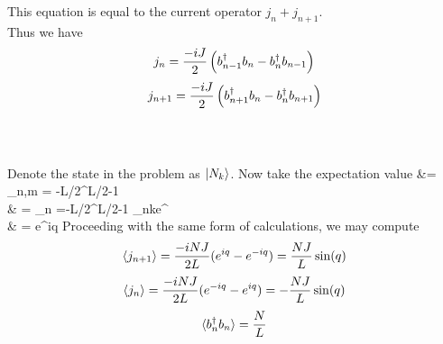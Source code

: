 \documentclass[10pt,letterpaper]{article}
\begin{document}
This equation is equal to the current operator $j_n+j_{n+1}$.\\
Thus we have
\[
	j_n =  \frac{-i J}{2}\left( b_{n-1}^\dag b_n - b_n^\dag b_{n-1}\right)
\]
\[
	j_{n+1} = \frac{-iJ}{2}\left( b_{n+1}^\dag b_n - b_n^\dag b_{n+1}\right)
\]\\ \\
\item
Denote the state in the problem as $\ket{N_k}$. Now take the expectation value
\ba
	 &= \sum_{n,m = -L/2}^{L/2-1} 
	\\
	& = \sum_{n =-L/2}^{L/2-1} \delta_{nk}e^{}\\
	& = e^{iq}
\ea
Proceeding with the same form of calculations, we may compute 
\[
	\braket{j_{n+1}} = \frac{-iNJ}{2L}(e^{iq}-e^{-iq}) = \frac{NJ}{L}\sin(q)
\]
\[
	\braket{j_{n}} = \frac{-iNJ}{2L}(e^{-iq}-e^{iq}) = -\frac{NJ}{L}\sin(q)
\]
\[
	\braket{b^\dag_n b_n} = \frac{N}{L}
\]
\end{document}
